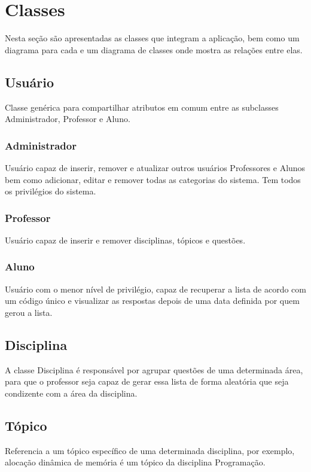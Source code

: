 \documentclass[12pt,oneside,a4paper,article]{abntex2}
\begin{document}
	\section{Classes}
		Nesta seção são apresentadas as classes que integram a aplicação, bem como um diagrama para cada e um diagrama de classes onde mostra
		as relações entre elas.
		
		\subsection{Usuário}
			Classe genérica para compartilhar atributos em comum entre as subclasses Administrador, Professor e Aluno.
	
				\subsubsection{Administrador}
					Usuário capaz de inserir, remover e atualizar outros usuários Professores e Alunos bem como adicionar, editar e remover todas as categorias do
					sistema. Tem todos os privilégios do sistema.
				\subsubsection{Professor}
				Usuário capaz de inserir e remover disciplinas, tópicos e questões.
	
				\subsubsection{Aluno}
					Usuário com o menor nível de privilégio, capaz de recuperar a lista de acordo com um código único e visualizar as respostas depois de uma data definida
					por quem gerou a lista.

		\subsection{Disciplina}
			A classe Disciplina é responsável por agrupar questões de uma determinada área, para que o professor seja capaz de gerar essa lista de forma aleatória que seja condizente
			com a área da disciplina.
	
		\subsection{Tópico}
			Referencia a um tópico específico de uma determinada disciplina, por exemplo, alocação dinâmica de memória é um tópico da disciplina Programação.
	
\end{document}
